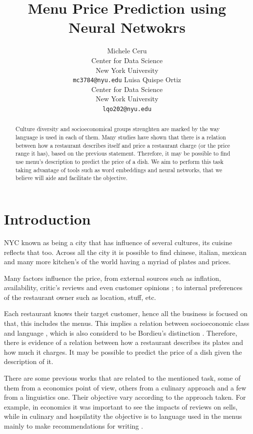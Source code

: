 \documentclass[11pt,letterpaper]{article}
\title{Menu Price Prediction using Neural Netwokrs}
\author{Michele Ceru \\
	    Center for Data Science\\
		New York University\\
	    {\tt mc3784@nyu.edu}
	  \And
	Luisa Quispe Ortiz\\
  	Center for Data Science \\
  	New York University\\
  {\tt lqo202@nyu.edu}}
\date{}
\begin{document}
\maketitle

\begin{abstract}
Culture diversity and socioeconomical groups strenghten are marked by the way language is used in each of them.
Many studies have shown that there is a relation between how a restaurant describes itself and price a restaurant charge (or the price range it has), based on the previous statement. Therefore, it may be possible to find use menu's description to predict the price of a dish. We aim  to perform this task taking advantage of tools such as word embeddings and neural networks, that we believe will aide and facilitate the objective.
\end{abstract}

\section{Introduction}

NYC known as being a city that has influence of several cultures, its cuisine reflects that too. Across all the city it is possible to find chinese, italian, mexican and many more kitchen’s of the world having a myriad of plates and prices.

Many factors influence the price, from external sources such as inflation, availability, critic’s reviews and even customer opinions \cite{jurafsky2014language}; to internal preferences of the restaurant owner such as location, stuff, etc. 

Each restaurant knows their target customer, hence all the business is focused on that, this includes the menus. This implies a relation between socioeconomic class and language \cite{freedman2011authenticity}, which is also considerd to be Bordieu's distinction \cite{jurafsky2016bordieu}. Therefore, there is evidence of a relation between how a restaurant describes its plates and how much it charges. It may be possible to predict the price of a dish given the description of it. 

There are some previous works that are related to the mentioned task, some of them from a economics point of view, others from a culinary approach and a few from a linguistics one. Their objective vary according to the approach taken. For example, in economics it was important to see the impacts of reviews on sells, while in culinary and hospilatity the objective is to language used in the menus mainly to make recommendations for writing \cite{chahuneau2012word}.
\end{document}
